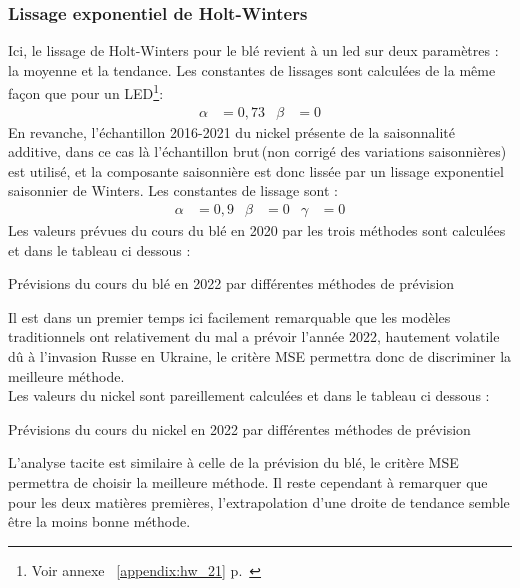\subsubsection*{Lissage exponentiel de Holt-Winters}
Ici, le lissage de Holt-Winters pour le blé revient à un led sur deux paramètres : la moyenne et la tendance. Les constantes de lissages sont calculées de la même façon que
pour un LED\footnote{Voir annexe ~\ref{appendix:hw_21} p.~\pageref{appendix:hw_21}}: 
\begin{align*}
    \alpha &= 0,73 & \beta &= 0
\end{align*}
En revanche, l'échantillon 2016-2021 du nickel présente de la saisonnalité additive, dans ce cas là l'échantillon \guillemotleft brut\guillemotright \,(non corrigé des 
variations saisonnières) est utilisé, et la composante saisonnière est donc lissée par un lissage exponentiel saisonnier de Winters. Les constantes de lissage sont :
\begin{align*}
    \alpha &= 0,9 & \beta &= 0 & \gamma &= 0
\end{align*}
Les valeurs prévues du cours du blé en 2020 par les trois méthodes sont calculées et dans le tableau ci dessous :
\begin{table}[H]
    \centering
    \caption{Prévisions du cours du blé en 2022 par différentes méthodes de prévision}
    \sffamily
    
\end{table}
Il est dans un premier temps ici facilement remarquable que les modèles traditionnels ont relativement du mal a prévoir l'année 2022, hautement volatile dû à l'invasion 
Russe en Ukraine, le critère MSE permettra donc de discriminer la meilleure méthode. \\[11pt]
Les valeurs du nickel sont pareillement calculées et dans le tableau ci dessous :
\begin{table}[H]
    \centering
    \caption{Prévisions du cours du nickel en 2022 par différentes méthodes de prévision}
    \sffamily
    
\end{table}
L'analyse tacite est similaire à celle de la prévision du blé, le critère MSE permettra de choisir la meilleure méthode. Il reste cependant à remarquer que pour les deux 
matières premières, l'extrapolation d'une droite de tendance semble être la moins bonne méthode.
